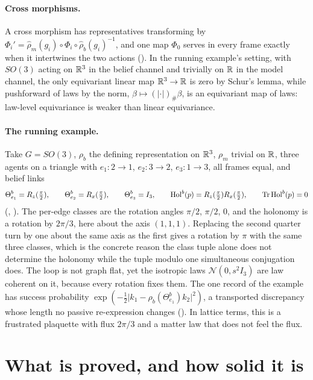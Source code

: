 \paragraph{Cross morphisms.}
A cross morphism has representatives transforming by
$\Phi_i'=\widehat\rho_m(g_i)\circ\Phi_i\circ\widehat\rho_b(g_i)^{-1}$, and one map $\Phi_0$ serves in every frame
exactly when it intertwines the two actions (). In the running example's
setting, with $SO(3)$ acting on $\mathbb R^3$ in the belief channel and trivially on $\mathbb R$ in the model channel, the only
equivariant linear map $\mathbb R^3\to\mathbb R$ is zero by Schur's lemma, while pushforward of laws by the norm,
$\beta\mapsto(\lvert\cdot\rvert)_\#\beta$, is an equivariant map of laws: law-level equivariance is weaker than
linear equivariance.

\paragraph{The running example.}
Take $G=SO(3)$, $\rho_b$ the defining representation on $\mathbb R^3$, $\rho_m$ trivial on $\mathbb R$, three agents on a
triangle with $e_1:2\to1$, $e_2:3\to2$, $e_3:1\to3$, all frames equal, and belief links
\[
\Theta_{e_1}^b=R_z(\tfrac\pi2),
\qquad
\Theta_{e_2}^b=R_x(\tfrac\pi2),
\qquad
\Theta_{e_3}^b=I_3,
\qquad
\mathrm{Hol}^b(p)=R_z(\tfrac\pi2)R_x(\tfrac\pi2),
\qquad
\operatorname{Tr}\mathrm{Hol}^b(p)=0
\]
(, ). The per-edge classes are the rotation angles
$\pi/2$, $\pi/2$, $0$, and the holonomy is a rotation by $2\pi/3$, here about the axis $(1,1,1)$. Replacing the
second quarter turn by one about the same axis as the first gives a rotation by $\pi$ with the same three
classes, which is the concrete reason the class tuple alone does not determine the holonomy while the tuple
modulo one simultaneous conjugation does. The loop is not graph flat, yet the isotropic laws
$\mathcal N(0,s^2I_3)$ are law coherent on it, because every rotation fixes them. The one record of the
example has success probability $\exp(-\tfrac12\lvert k_1-\rho_b(\Theta_{e_1}^b)k_2\rvert^2)$, a transported
discrepancy whose length no passive re-expression changes (). In lattice terms,
this is a frustrated plaquette with flux $2\pi/3$ and a matter law that does not feel the flux.

\section{What is proved, and how solid it is}
\label{comp:ch02-status}

